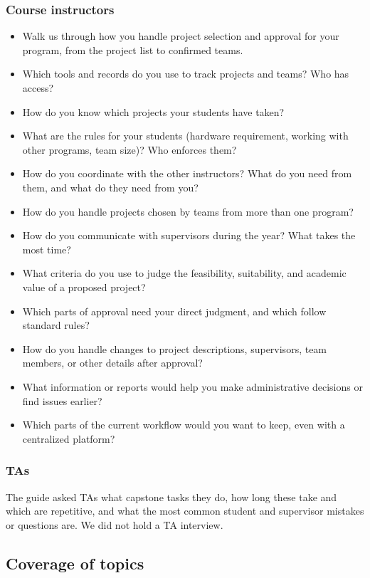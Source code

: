 \documentclass{article}
\begin{document}
    \subsubsection*{Course instructors}
    \begin{itemize}
        \item Walk us through how you handle project selection and approval for your program, from the project list to confirmed teams.
        \item Which tools and records do you use to track projects and teams? Who has access?
        \item How do you know which projects your students have taken?
        \item What are the rules for your students (hardware requirement, working with other programs, team size)? Who enforces them?
        \item How do you coordinate with the other instructors? What do you need from them, and what do they need from you?
        \item How do you handle projects chosen by teams from more than one program?
        \item How do you communicate with supervisors during the year? What takes the most time?
        \item What criteria do you use to judge the feasibility, suitability, and academic value of a proposed project?
        \item Which parts of approval need your direct judgment, and which follow standard rules?
        \item How do you handle changes to project descriptions, supervisors, team members, or other details after approval?
        \item What information or reports would help you make administrative decisions or find issues earlier?
        \item Which parts of the current workflow would you want to keep, even with a centralized platform?
    \end{itemize}

    \subsubsection*{TAs}
    The guide asked TAs what capstone tasks they do, how long these take and which
    are repetitive, and what the most common student and supervisor mistakes or
    questions are. We did not hold a TA interview.

    \subsection{Coverage of topics}
\end{document}
